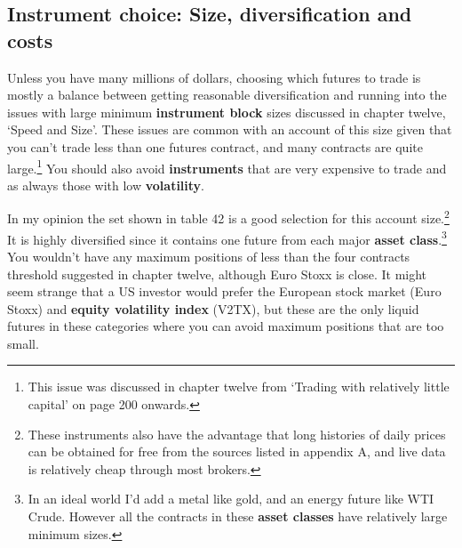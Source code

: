 \subsection*{Instrument choice: Size, diversification and costs}

Unless you have many millions of dollars, choosing which futures to trade is mostly a balance between getting reasonable diversification and running into the issues with large minimum \textbf{instrument block} sizes discussed in chapter twelve, ‘Speed and Size'. These issues are common with an account of this size given that you can't trade less than one futures contract, and many contracts are quite large.\footnote{This issue was discussed in chapter twelve from ‘Trading with relatively little capital' on page 200 onwards.} You should also avoid \textbf{instruments} that are very expensive to trade and as always those with low \textbf{volatility}.

In my opinion the set shown in table 42 is a good selection for this account size.\footnote{These instruments also have the advantage that long histories of daily prices can be obtained for free from the sources listed in appendix A, and live data is relatively cheap through most brokers.} It is highly diversified since it contains one future from each major \textbf{asset class}.\footnote{In an ideal world I'd add a metal like gold, and an energy future like WTI Crude. However all the contracts in these \textbf{asset classes} have relatively large minimum sizes.} You wouldn't have any maximum positions of less than the four contracts threshold suggested in chapter twelve, although Euro Stoxx is close. It might seem strange that a US investor would prefer the European stock market (Euro Stoxx) and \textbf{equity volatility index} (V2TX), but these are the only liquid futures in these categories where you can avoid maximum positions that are too small.

 

